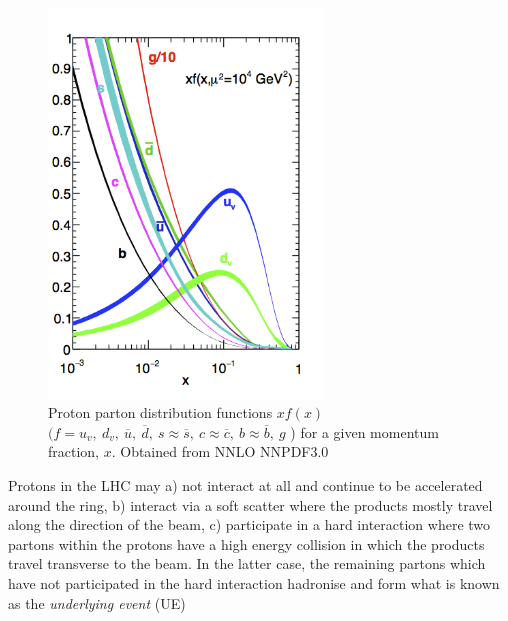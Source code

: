 \begin{figure}[ht!]
\begin{center}
    \includegraphics[width=0.65\textwidth]{images/Theory/pdfnob.png}
    \caption{Proton parton distribution functions $xf(x)$ $(f = u_{v},~ d_{v},~ \overline{u},~ \overline{d},~ s\approx\overline{s},~ c\approx\overline{c},~ b\approx\overline{b},~ g$ ) for a given momentum fraction, $x$. Obtained from NNLO NNPDF3.0~\cite{Ball2015}}
    \label{fig:protonPDF}
\end{center}
\end{figure}

Protons in the LHC may a) not interact at all and continue to be accelerated around the ring, b) interact via a soft scatter where the products mostly travel along the direction of the beam, c) participate in a hard interaction where two partons within the protons have a high energy collision in which the products travel transverse to the beam. In the latter case, the remaining partons which have not participated in the hard interaction hadronise and form what is known as the \emph{underlying event} (UE)

